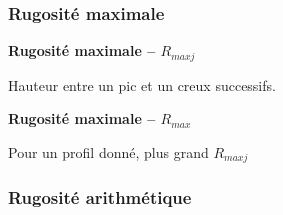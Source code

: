 \documentclass[10pt]{article}
\begin{document}
\subsubsection{Rugosité maximale} 
\begin{minipage}[c]{.2\linewidth}
\begin{center}
\end{center}
\end{minipage}\hfill
\begin{minipage}[c]{.75\linewidth}
\begin{defi}
\textbf{Rugosité maximale -- $R_{max j}$} 

Hauteur entre un pic et un creux successifs.

\textbf{Rugosité maximale -- $R_{max}$} 

Pour un profil donné, plus grand $R_{max j}$
\end{defi}
\end{minipage}

\subsubsection{Rugosité arithmétique} 

\begin{thebibliography}{2}
\end{thebibliography}
\end{document}
